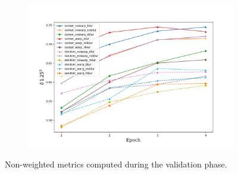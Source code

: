\begin{figure}
\begin{adjustwidth}{-0.2\textwidth}{-0.2\textwidth}
        \begin{subfigure}{0.6\textwidth}
            \includegraphics[width=\textwidth]{figs/a3}
        \end{subfigure}
    \end{adjustwidth}
    \caption{
        Non-weighted metrics computed during the validation phase.
        \label{fig:validation}
    }
\end{figure}

